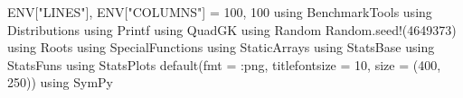 \documentclass[
  letterpaper,
  DIV=11,
  numbers=noendperiod]{scrartcl}
\newenvironment{Shaded}{\begin{snugshade}}{\end{snugshade}}
\newcommand{\BuiltInTok}[1]{\textcolor[rgb]{0.00,0.23,0.31}{#1}}
\newcommand{\ConstantTok}[1]{\textcolor[rgb]{0.56,0.35,0.01}{#1}}
\newcommand{\FloatTok}[1]{\textcolor[rgb]{0.68,0.00,0.00}{#1}}
\newcommand{\FunctionTok}[1]{\textcolor[rgb]{0.28,0.35,0.67}{#1}}
\newcommand{\ImportTok}[1]{\textcolor[rgb]{0.00,0.46,0.62}{#1}}
\newcommand{\NormalTok}[1]{\textcolor[rgb]{0.00,0.23,0.31}{#1}}
\newcommand{\OperatorTok}[1]{\textcolor[rgb]{0.37,0.37,0.37}{#1}}
\newcommand{\StringTok}[1]{\textcolor[rgb]{0.13,0.47,0.30}{#1}}
\begin{document}
\begin{Shaded}
\begin{Highlighting}[]
\ConstantTok{ENV}\NormalTok{[}\StringTok{"LINES"}\NormalTok{], }\ConstantTok{ENV}\NormalTok{[}\StringTok{"COLUMNS"}\NormalTok{] }\OperatorTok{=} \FloatTok{100}\NormalTok{, }\FloatTok{100}
\ImportTok{using} \BuiltInTok{BenchmarkTools}
\ImportTok{using} \BuiltInTok{Distributions}
\ImportTok{using} \BuiltInTok{Printf}
\ImportTok{using} \BuiltInTok{QuadGK}
\ImportTok{using} \BuiltInTok{Random}
\BuiltInTok{Random}\NormalTok{.}\FunctionTok{seed!}\NormalTok{(}\FloatTok{4649373}\NormalTok{)}
\ImportTok{using} \BuiltInTok{Roots}
\ImportTok{using} \BuiltInTok{SpecialFunctions}
\ImportTok{using} \BuiltInTok{StaticArrays}
\ImportTok{using} \BuiltInTok{StatsBase}
\ImportTok{using} \BuiltInTok{StatsFuns}
\ImportTok{using} \BuiltInTok{StatsPlots}
\FunctionTok{default}\NormalTok{(fmt }\OperatorTok{=} \OperatorTok{:}\NormalTok{png, titlefontsize }\OperatorTok{=} \FloatTok{10}\NormalTok{, size }\OperatorTok{=}\NormalTok{ (}\FloatTok{400}\NormalTok{, }\FloatTok{250}\NormalTok{))}
\ImportTok{using} \BuiltInTok{SymPy}
\end{Highlighting}
\end{Shaded}
\end{document}
